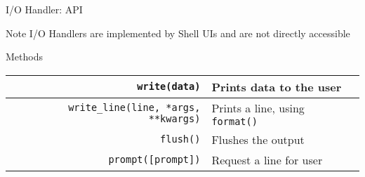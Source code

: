 \begin{frame}{I/O Handler: API}
\begin{small}
\begin{exampleblock}{Note}
I/O Handlers are implemented by Shell UIs and are not directly accessible
\end{exampleblock}

\begin{block}{Methods}
\begin{center}
\begin{tabular}{rl}
\texttt{write({\scriptsize data})} & Prints data to the user \\
\hline
\texttt{write\_line({\scriptsize line, *args, **kwargs})} & Prints a line, using \texttt{format()} \\
\hline
\texttt{flush()} & Flushes the output \\
\hline
\texttt{prompt({\scriptsize [prompt]})} & Request a line for user \\
\end{tabular}
\end{center}
\end{block}
\end{small}
\end{frame}
